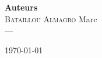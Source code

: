 \begin{titlepage}
\begin{center}
\vfill
{\large
\begin{center}
  {\Large  \hspace{0.5cm} \textbf{Auteurs} \hspace{0.5cm}   } \\[0.3cm]
	\textsc{Bataillou Almagro} Marc \\
	  ---
\end{center}
}
\vfill

{\large \today}

\end{center}
\end{titlepage}